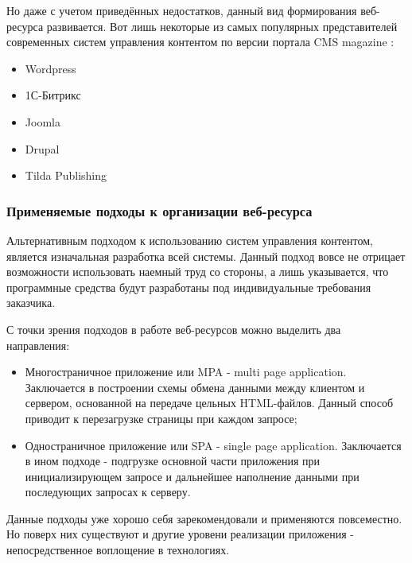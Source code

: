         Но даже с учетом приведённых недостатков, данный вид формирования веб-ресурса развивается.
        Вот лишь некоторые из самых популярных представителей современных систем управления контентом по версии портала CMS magazine \cite{}:
        \begin{itemize}
            \item Wordpress
            \item 1С-Битрикс
            \item Joomla
            \item Drupal
            \item Tilda Publishing
        \end{itemize}

    \subsubsection{Применяемые подходы к организации веб-ресурса}
        Альтернативным подходом к использованию систем управления контентом, является изначальная разработка всей системы.
        Данный подход вовсе не отрицает возможности использовать наемный труд со стороны, а лишь указывается, что программные средства будут разработаны под индивидуальные требования заказчика.

        С точки зрения подходов в работе веб-ресурсов можно выделить два направления:
        \begin{itemize}
            \item Многостраничное приложение или MPA - multi page application.
            Заключается в построении схемы обмена данными между клиентом и сервером, основанной на передаче цельных HTML-файлов.
            Данный способ приводит к перезагрузке страницы при каждом запросе;
            \item Одностраничное приложение или SPA - single page application.
            Заключается в ином подходе - подгрузке основной части приложения при инициализирующем запросе и дальнейшее наполнение данными при последующих запросах к серверу.
        \end{itemize}

        Данные подходы уже хорошо себя зарекомендовали и применяются повсеместно.
        Но поверх них существуют и другие уровени реализации приложения - непосредственное воплощение в технологиях.

